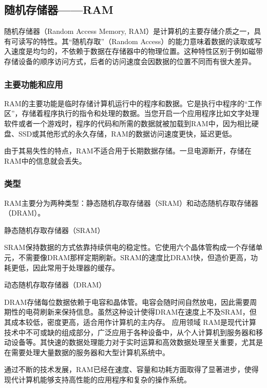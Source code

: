 
\begin{issues}
\issueDraft
\end{issues}

\subsection{随机存储器——RAM}

随机存储器（Random Access Memory, RAM）是计算机的主要存储介质之一，具有可读写的特性。其“随机存取”（Random Access）的能力意味着数据的读取或写入速度是均匀的，不依赖于数据在存储器中的物理位置。这种特性区别于例如磁带存储设备的顺序访问方式，后者的访问速度会因数据的位置不同而有很大差异。
\subsubsection{主要功能和应用}
RAM的主要功能是临时存储计算机运行中的程序和数据。它是执行中程序的“工作区”，存储着程序执行的指令和处理的数据。当您开启一个应用程序比如文字处理软件或者一个游戏时，程序的代码和所需的数据就被加载到RAM中，因为相比硬盘、SSD或其他形式的永久存储，RAM的数据访问速度更快，延迟更低。

由于其易失性的特点，RAM不适合用于长期数据存储。一旦电源断开，存储在RAM中的信息就会丢失。
\subsubsection{类型}

RAM主要分为两种类型：静态随机存取存储器（SRAM）和动态随机存取存储器（DRAM）。

静态随机存取存储器（SRAM）

SRAM保持数据的方式依靠持续供电的稳定性。它使用六个晶体管构成一个存储单元，不需要像DRAM那样定期刷新。SRAM的速度比DRAM快，但造价更高，功耗更低，因此常用于处理器的缓存。

动态随机存取存储器（DRAM）

DRAM存储每位数据依赖于电容和晶体管。电容会随时间自然放电，因此需要周期性的电荷刷新来保持信息。虽然这种设计使得DRAM在速度上不及SRAM，但其成本较低，密度更高，适合用作计算机的主内存。
应用领域
RAM是现代计算技术中不可或缺的组成部分，广泛应用于各种设备中，从个人计算机到服务器和移动设备等。其快速的数据处理能力对于实时运算和高效数据处理至关重要，尤其是在需要处理大量数据的服务器和大型计算机系统中。

通过不断的技术发展，RAM已经在速度、容量和功耗方面取得了显著进步，使得现代计算机能够支持高性能的应用程序和复杂的操作系统。

